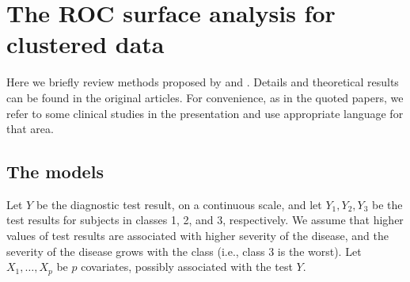 \hypertarget{roc-surface-analysis-for-clustered-data}{%
\section{The ROC surface analysis for clustered data}\label{roc-surface-analysis-for-clustered-data}}

Here we briefly review methods proposed by \citet{xiong2018estimating} and \citet{khanh2022}. Details and theoretical results can be found in the original articles. {For convenience, as in the quoted papers, we refer to some clinical studies in the presentation and use appropriate language for that area.}

\hypertarget{the-models}{%
\subsection{The models}\label{the-models}}

Let $Y$ be the diagnostic test result, on a continuous scale, and let $Y_1, Y_2, Y_3$ be the test results for subjects in classes 1, 2, and 3, respectively. We assume that higher values of test results are associated with higher severity of the disease, and the severity of the disease grows with the class (i.e., class 3 is the worst). Let $X_1, \ldots, X_p$ be $p$ covariates, possibly associated with the test $Y$.

